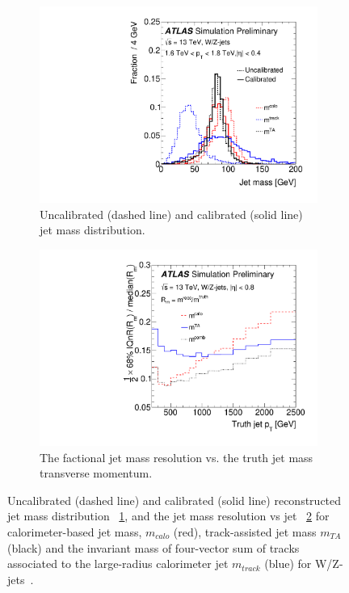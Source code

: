\begin{figure}[htbp!]
  \centering
  \captionsetup{justification=centering}
	\hspace{-2cm}
    \begin{subfigure}[b]{0.45\textwidth}
        \includegraphics[width=\textwidth,angle=-90]{figures/object/Jet_mass}
        \caption{Uncalibrated (dashed line) and calibrated (solid line) jet mass distribution.}
        \label{fig:obj_jet_mass_dist}
    \end{subfigure}
    \quad
    \begin{subfigure}[b]{0.45\textwidth}
        \includegraphics[width=\textwidth,angle=-90]{figures/object/Jet_mass_resolution}
        \caption{The factional jet mass resolution vs.  the truth jet mass transverse momentum.}
        \label{fig:obj_jet_mass_resolution}
    \end{subfigure}
   \caption{Uncalibrated (dashed line) and calibrated (solid line) reconstructed jet mass distribution ~\ref{fig:obj_jet_mass_dist}, and the jet mass resolution vs jet \pt ~\ref{fig:obj_jet_mass_resolution} for calorimeter-based jet mass, $m_{calo}$ (red), track-assisted jet mass $m_{TA}$ (black) and the invariant mass of four-vector sum of tracks associated to the large-radius calorimeter jet $m_{track}$ (blue) for W/Z-jets~\cite{ATLAS-CONF-2016-035}.}
  \label{fig:obj_jet_mass}
\end{figure}

